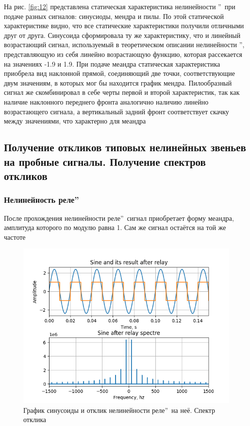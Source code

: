 На рис. \ref{fig:12} представлена статическая характеристика
нелинейности \textquotedblright\ при подаче разных сигналов: синусиоды, мендра
и пилы. По этой статической характеристике видно, что все статические
характеристики получили отличными друг от друга. Синусоида
сформировала ту же характеристику, что и линейный возрастающий
сигнал, используемый в теоретическом описании нелинейности
\textquotedblright, представляющую из себя линейно возрастающую
функцию, которая рассекается на значениях -1.9 и 1.9.
При подаче меандра статическая характеристика приобрела вид
наклонной прямой, соединяющий две точки, соответствующие двум
значениям, в которых мог бы находится график мендра.
Пилообразный сигнал же скомбинировал в себе черты первой
и второй характеристик, так как наличие наклонного переднего
фронта аналогично наличию линейно возрастающего сигнала,
а вертикальный задний фронт соответствует скачку между
значениями, что характерно для меандра

\subsection{Получение откликов типовых нелинейных звеньев на пробные сигналы.
Получение спектров откликов}

\subsubsection{Нелинейность  реле\textquotedblright}

После прохождения нелинейности  реле\textquotedblright\
сигнал приобретает форму меандра, амплитуда которого по модулю равна 1. Сам же
сигнал остаётся на той же частоте

\begin{figure}[H]
	\centering
	\includegraphics[width=0.75\linewidth]{body/images/sine-after-relay-and-its-spectre.png}
	\caption{График синусоиды и отклик нелинейности 
	 реле\textquotedblright\ на неё. Спектр отклика}
	\label{fig:13}
\end{figure}

